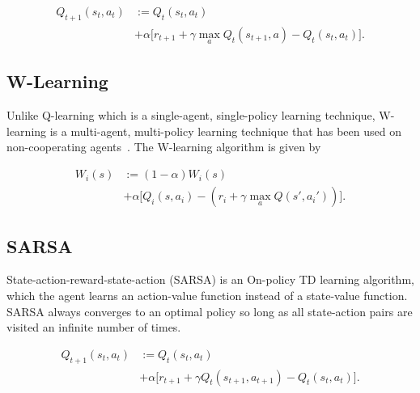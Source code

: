 \documentclass[journal]{IEEEtran}
\begin{document}

\begin{equation}\label{eqn1}
\begin{split}
Q_{t + 1}(s_t, a_t) &:= Q_{t}(s_t, a_t)\\
& + \alpha \Big[ r_{t + 1} + \gamma \max_{a}  Q_{t}(s_{t + 1}, a) -  Q_{t}(s_t, a_t) \Big].
   \end{split}
\end{equation}



\subsection{W-Learning}
Unlike Q-learning which is a single-agent, single-policy learning technique, W-learning is a multi-agent, multi-policy learning technique that has been used on non-cooperating agents~\cite{Dusparic2009}. The W-learning algorithm is given by

\begin{equation}\label{eqn2}
\begin{split}
W_{i}(s) &:= (1 - \alpha)W_{i}(s) \\
& + \alpha \Big[ Q_{i}(s, a_i)  - (r_i + \gamma \max_{a}  Q(s', a_i')) \Big].
   \end{split}
\end{equation}


\subsection{SARSA}
State-action-reward-state-action (SARSA) is an On-policy TD learning algorithm, which the agent learns an action-value function instead of a state-value function. SARSA always converges to an optimal policy so long as all state-action pairs are visited an infinite number of times.

\begin{equation}\label{eqn3}
\begin{split}
Q_{t + 1}(s_t, a_t) &:= Q_{t}(s_t, a_t)\\
& + \alpha \Big[ r_{t + 1} + \gamma Q_{t}(s_{t + 1}, a_{t + 1}) -  Q_{t}(s_t, a_t) \Big].
   \end{split}
\end{equation}
\end{document}
